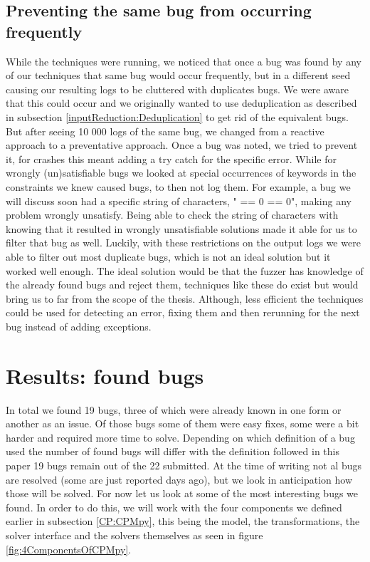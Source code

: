 \subsection{Preventing the same bug from occurring frequently}
While the techniques were running, we noticed that once a bug was found by any of our techniques that same bug would occur frequently, but in a different seed causing our resulting logs to be cluttered with duplicates bugs. We were aware that this could occur and we originally wanted to use deduplication as described in subsection \ref{inputReduction:Deduplication} to get rid of the equivalent bugs. But after seeing 10 000 logs of the same bug, we changed from a reactive approach to a preventative approach. Once a bug was noted, we tried to prevent it, for crashes this meant adding a try catch for the specific error. While for wrongly (un)satisfiable bugs we looked at special occurrences of keywords in the constraints we knew caused bugs, to then not log them. For example, a bug we will discuss soon had a specific string of characters, " == 0 == 0", making any problem wrongly unsatisfy. Being able to check the string of characters with knowing that it resulted in wrongly unsatisfiable solutions made it able for us to filter that bug as well. Luckily, with these restrictions on the output logs we were able to filter out most duplicate bugs, which is not an ideal solution but it worked well enough. The ideal solution would be that the fuzzer has knowledge of the already found bugs and reject them, techniques like these do exist but would bring us to far from the scope of the thesis. Although, less efficient the techniques could be used for detecting an error, fixing them and then rerunning for the next bug instead of adding exceptions.

\section{Results: found bugs}
\label{res:bugs}
In total we found 19 bugs, three of which were already known in one form or another as an issue. Of those bugs some of them were easy fixes, some were a bit harder and required more time to solve. Depending on which definition of a bug used the number of found bugs will differ with the definition followed in this paper 19 bugs remain out of the 22 submitted. At the time of writing not al bugs are resolved (some are just reported days ago), but we look in anticipation how those will be solved. For now let us look at some of the most interesting bugs we found. In order to do this, we will work with the four components we defined earlier in subsection \ref{CP:CPMpy}, this being the model, the transformations, the solver interface and the solvers themselves as seen in figure \ref{fig:4ComponentsOfCPMpy}.


